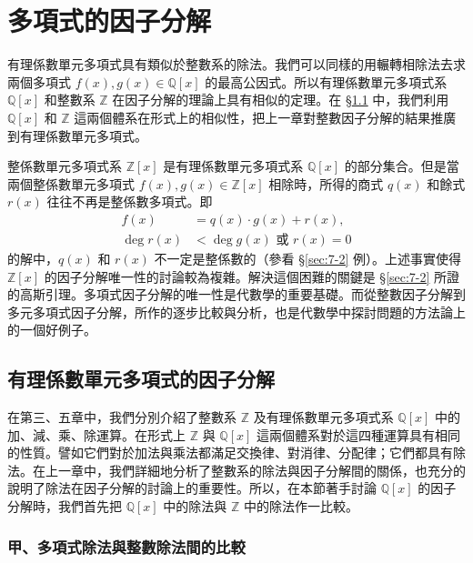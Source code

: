 \section{多項式的因子分解}\label{sec:ch7}

有理係數單元多項式具有類似於整數系的除法。我們可以同樣的用輾轉相除法去求兩個多項式 $f(x), g(x) \in \mathbb{Q}[x]$ 的最高公因式。所以有理係數單元多項式系 $\mathbb{Q}[x]$ 和整數系 $\mathbb{Z}$ 在因子分解的理論上具有相似的定理。在 \S\ref{sec:7-1} 中，我們利用 $\mathbb{Q}[x]$ 和 $\mathbb{Z}$ 這兩個體系在形式上的相似性，把上一章對整數因子分解的結果推廣到有理係數單元多項式。

整係數單元多項式系 $\mathbb{Z}[x]$ 是有理係數單元多項式系 $\mathbb{Q}[x]$ 的部分集合。但是當兩個整係數單元多項式 $f(x), g(x) \in \mathbb{Z}[x]$ 相除時，所得的商式 $q(x)$ 和餘式 $r(x)$ 往往不再是整係數多項式。即
\begin{align*}
  f(x) &= q(x) \cdot g(x) + r(x), \\
  \deg r(x) &< \deg g(x) \text{ 或 } r(x) = 0
\end{align*}
的解中，$q(x)$ 和 $r(x)$ 不一定是整係數的（參看 \S\ref{sec:7-2} 例）。上述事實使得 $\mathbb{Z}[x]$ 的因子分解唯一性的討論較為複雜。解決這個困難的關鍵是 \S\ref{sec:7-2} 所證的高斯引理。多項式因子分解的唯一性是代數學的重要基礎。而從整數因子分解到多元多項式因子分解，所作的逐步比較與分析，也是代數學中探討問題的方法論上的一個好例子。

\subsection{有理係數單元多項式的因子分解}\label{sec:7-1}

在第三、五章中，我們分別介紹了整數系 $\mathbb{Z}$ 及有理係數單元多項式系 $\mathbb{Q}[x]$ 中的加、減、乘、除運算。在形式上 $\mathbb{Z}$ 與 $\mathbb{Q}[x]$ 這兩個體系對於這四種運算具有相同的性質。譬如它們對於加法與乘法都滿足交換律、對消律、分配律；它們都具有除法。在上一章中，我們詳細地分析了整數系的除法與因子分解間的關係，也充分的說明了除法在因子分解的討論上的重要性。所以，在本節著手討論 $\mathbb{Q}[x]$ 的因子分解時，我們首先把 $\mathbb{Q}[x]$ 中的除法與 $\mathbb{Z}$ 中的除法作一比較。

\subsubsection*{甲、多項式除法與整數除法間的比較}\label{subsec:7-1-a}

